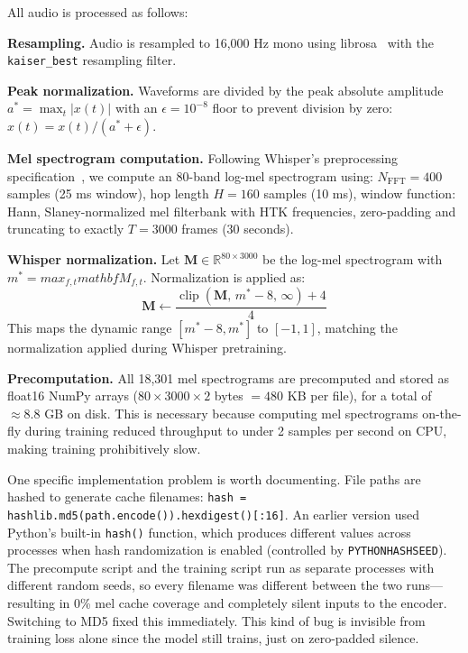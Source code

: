 \documentclass[10pt,journal,compsoc]{IEEEtran}
\begin{document}
All audio is processed as follows:

\textbf{Resampling.} Audio is resampled to 16{,}000 Hz mono using
librosa~\cite{librosa} with the \texttt{kaiser\_best} resampling filter.

\textbf{Peak normalization.} Waveforms are divided by the peak absolute
amplitude $a^* = \max_t |x(t)|$ with an $\epsilon = 10^{-8}$ floor to
prevent division by zero: $\hat{x}(t) = x(t) / (a^* + \epsilon)$.

\textbf{Mel spectrogram computation.}
Following Whisper's preprocessing specification~\cite{whisper},
we compute an 80-band log-mel spectrogram using:
$N_\mathrm{FFT} = 400$ samples (25 ms window),
hop length $H = 160$ samples (10 ms),
window function: Hann,
Slaney-normalized mel filterbank with HTK frequencies,
zero-padding and truncating to exactly $T = 3000$ frames (30 seconds).

\textbf{Whisper normalization.}
Let $\mathbf{M} \in \mathbb{R}^{80 \times 3000}$ be the log-mel spectrogram
with $m^* = max_{f,t} mathbf{M}_{f,t}$. Normalization is applied as:
\begin{equation}
\mathbf{M} \leftarrow \frac{\operatorname{clip}(\mathbf{M},\, m^*-8,\,\infty) + 4}{4}
\label{eq:whisper_norm}
\end{equation}
This maps the dynamic range $[m^*-8, m^*]$ to $[-1, 1]$, matching the
normalization applied during Whisper pretraining.

\textbf{Precomputation.}
All 18{,}301 mel spectrograms are precomputed and stored as float16 NumPy
arrays ($80 \times 3000 \times 2$ bytes $= 480$ KB per file),
for a total of $\approx 8.8$ GB on disk. This is necessary because computing
mel spectrograms on-the-fly during training reduced throughput to under
2 samples per second on CPU, making training prohibitively slow.

One specific implementation problem is worth documenting.
File paths are hashed to generate cache filenames:
\texttt{hash = hashlib.md5(path.encode()).hexdigest()[:16]}.
An earlier version used Python's built-in \texttt{hash()} function,
which produces different values across processes when hash randomization
is enabled (controlled by \texttt{PYTHONHASHSEED}).
The precompute script and the training script run as separate processes
with different random seeds, so every filename was different between
the two runs---resulting in 0\% mel cache coverage and completely silent
inputs to the encoder. Switching to MD5 fixed this immediately.
This kind of bug is invisible from training loss alone since the model
still trains, just on zero-padded silence.
\end{document}
